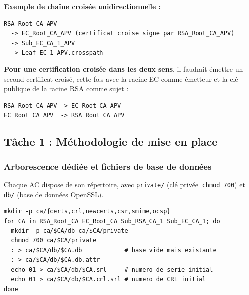 \documentclass[11pt,a4paper]{article}
\newcommand{\fichier}[1]{\texttt{#1}}
\begin{document}
\begin{reponse}
\textbf{Exemple de chaîne croisée unidirectionnelle :}
\begin{lstlisting}[style=out]
RSA_Root_CA_APV
  -> EC_Root_CA_APV (certificat croise signe par RSA_Root_CA_APV)
  -> Sub_EC_CA_1_APV
  -> Leaf_EC_1_APV.crosspath
\end{lstlisting}
\textbf{Pour une certification croisée dans les deux sens}, il faudrait émettre un
second certificat croisé, cette fois avec la racine EC comme émetteur et la clé publique
de la racine RSA comme sujet :
\begin{lstlisting}[style=out]
RSA_Root_CA_APV -> EC_Root_CA_APV
EC_Root_CA_APV  -> RSA_Root_CA_APV
\end{lstlisting}
\end{reponse}

\subsection{Tâche 1 : Méthodologie de mise en place}

\subsubsection{Arborescence dédiée et fichiers de base de données}
Chaque AC dispose de son répertoire, avec \fichier{private/} (clé privée, \texttt{chmod
700}) et \fichier{db/} (base de données OpenSSL).

\begin{lstlisting}[style=cmd]
mkdir -p ca/{certs,crl,newcerts,csr,smime,ocsp}
for CA in RSA_Root_CA EC_Root_CA Sub_RSA_CA_1 Sub_EC_CA_1; do
  mkdir -p ca/$CA/db ca/$CA/private
  chmod 700 ca/$CA/private
  : > ca/$CA/db/$CA.db            # base vide mais existante
  : > ca/$CA/db/$CA.db.attr
  echo 01 > ca/$CA/db/$CA.srl     # numero de serie initial
  echo 01 > ca/$CA/db/$CA.crl.srl # numero de CRL initial
done
\end{lstlisting}
\end{document}
